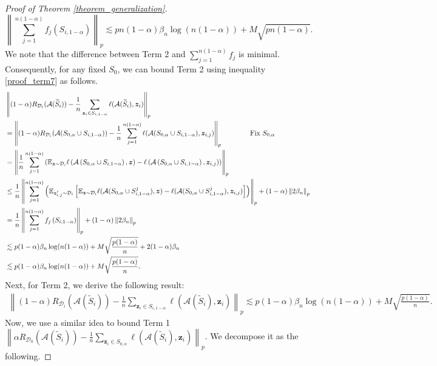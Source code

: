 \begin{proof}[Proof of Theorem \ref{theorem_generalization}]
\begin{equation}\label{proof_term7}
\left\|\sum_{j=1}^{n(1-\alpha)} f_j\left(S_{i,1-\alpha}\right)\right\|_p \lesssim p n(1-\alpha) \beta_{n} \log (n(1-\alpha))+M \sqrt{p n(1-\alpha)}.
\end{equation}
We note that the difference between Term 2 and $\sum_{j=1}^{n(1-\alpha)} f_j$ is minimal. Consequently, for any fixed $S_0$, we can bound Term 2 using inequality \ref{proof_term7} as follows.
\begin{align}
&\left\|(1-\alpha)R_{\mathcal{D}_i}(\mathcal{A}(\widetilde{S}_i))-\frac{1}{n}\sum_{\boldsymbol{z}_{i}\in S_{i,1-\alpha}}\ell(\mathcal{A}(\widetilde{S}_i),\boldsymbol{z}_{i})\right\|_{p} \notag \\
&=\left\|(1-\alpha)R_{\mathcal{D}_i}(\mathcal{A}(S_{0,\alpha} \cup S_{i,1-\alpha}))-\frac{1}{n}\sum_{j=1}^{n(1-\alpha)}\ell(\mathcal{A}(S_{0,\alpha} \cup S_{i,1-\alpha}),\boldsymbol{z}_{i,j})\right\|_{p}  \qquad \qquad \text{Fix}\ S_{0,\alpha}\notag \\
& =\left\|\frac{1}{n}\sum_{j=1}^{n(1-\alpha)}\left(\mathbb{E}_{\boldsymbol{z} \sim \mathcal{D}_i} \ell\left(\mathcal{A}\left(S_{0,\alpha} \cup S_{i,1-\alpha}\right), \boldsymbol{z}\right)-\ell\left(\mathcal{A}\left(S_{0,\alpha} \cup S_{i,1-\alpha}\right), \boldsymbol{z}_{i,j}\right)\right)\right\|_p \notag\\
& \leq \frac{1}{n}\left\|\sum_{j=1}^{n(1-\alpha)}\left(\mathbb{E}_{\boldsymbol{z}_{i,j}'\sim\mathcal{D}_i}\left[\mathbb{E}_{\boldsymbol{z}\sim\mathcal{D}_i}\ell(\mathcal{A}(S_{0,\alpha}\cup S_{i,1-\alpha}^j),\boldsymbol{z})-\ell(\mathcal{A}(S_{0,\alpha}\cup S_{i,1-\alpha}^j),\boldsymbol{z}_{i,j})\right]\right)\right\|_p+(1-\alpha)\left\|2\beta_{n}\right\|_p \notag \\
& =\frac{1}{n}\left\|\sum_{j=1}^{n(1-\alpha)} f_j\left(S_{i,1-\alpha}\right)\right\|_p+(1-\alpha)\left\|2  \beta_{n}\right\|_p \notag\\
& \lesssim p (1-\alpha) \beta_{n} \log (n(1-\alpha))+M \sqrt{\frac{p(1-\alpha)}{n}}+2 (1-\alpha) \beta_{n} \notag\\
& \lesssim p (1-\alpha) \beta_{n} \log (n(1-\alpha))+M \sqrt{\frac{p(1-\alpha)}{n}}.\notag
\end{align}
Next, for Term 2, we derive the following result:
\begin{align}
    \left\|(1-\alpha)R_{\mathcal{D}_i}(\mathcal{A}(\widetilde{S}_i))-\frac{1}{n}\sum_{\boldsymbol{z}_{i}\in S_{i,1-\alpha}}\ell(\mathcal{A}(\widetilde{S}_i),\boldsymbol{z}_{i})\right\|_{p}\lesssim p (1-\alpha) \beta_{n} \log (n(1-\alpha))+M \sqrt{\frac{p(1-\alpha)}{n}}. \label{proof-Term 2}
\end{align}
Now, we use a similar idea to bound Term 1 $\left\|\alpha R_{\mathcal{D}_0}(\mathcal{A}(\widetilde{S}_i))-\frac{1}{n}\sum_{\boldsymbol{z}_{i}\in S_{0,\alpha}}\ell(\mathcal{A}(\widetilde{S}_i),\boldsymbol{z}_{i})\right\|_{p}$. We decompose it as the following.



\end{proof}
